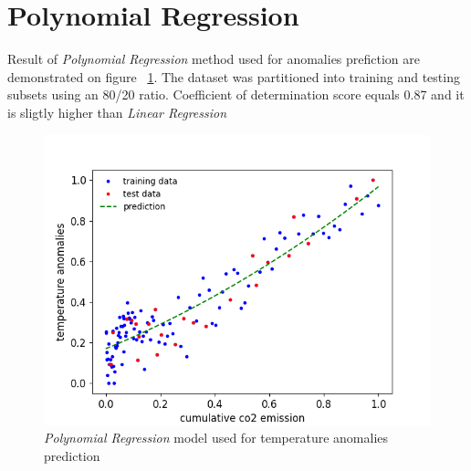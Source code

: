 \clearpage
\section{Polynomial Regression}
Result of \textit{Polynomial Regression} method used for anomalies prefiction are demonstrated on figure ~\ref{fig:polynomial-regression}. 
The dataset was partitioned into training and testing subsets using an 80/20 ratio. Coefficient of determination score equals 0.87 and it is sligtly higher than \textit{Linear Regression}
\begin{figure}[h]
  \includegraphics[width=\linewidth]{img/polynomial-regression.png}
  \caption{\textit{Polynomial Regression} model used for temperature anomalies prediction}
  \label{fig:polynomial-regression}
\end{figure}

